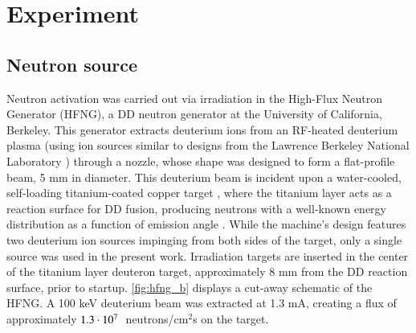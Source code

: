 \section{Experiment}\label{sec:experiment_np}



\subsection{Neutron source}\label{sec:n_source}



Neutron activation was carried out via irradiation in the High-Flux Neutron Generator (HFNG), a DD neutron generator at the University of California, Berkeley.
This generator extracts deuterium ions from an RF-heated deuterium plasma (using ion sources similar to  designs from the Lawrence Berkeley National Laboratory \cite{doi:10.1063/1.3267832}) through a nozzle, whose shape was designed to form a flat-profile beam, 5 mm in diameter.
This deuterium beam is incident upon a water-cooled, self-loading titanium-coated copper target \cite{Waltz2017,Waltz2016a}, where the titanium layer acts as a reaction surface for DD fusion, producing neutrons with a well-known energy distribution as a function of  emission angle \cite{Liskien_Paulsen_1973}.
While the machine's design features two deuterium ion sources impinging from both sides of the target, only a single source was used in the present work.
Irradiation targets are inserted in the center of the titanium layer deuteron target, approximately 8 mm from the DD reaction surface, prior to startup.
\autoref{fig:hfng_b} displays a cut-away schematic of the HFNG.
A 100 keV deuterium beam was extracted at 1.3 mA, creating a flux of approximately  $1.3 \cdot 10^{7}\ $ neutrons/cm$^2$s on the target.





